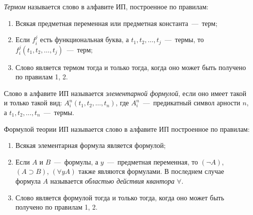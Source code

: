 \begin{definition*}
    \textit{Термом} называется слово в алфавите ИП, построенное по правилам:
    \begin{enumerate}
        \item Всякая предметная переменная или предметная константа~---~терм;
        \item Если $f_i^j$ есть функциональная буква, а $t_1, t_2, \dots, t_j$~---~термы, то $f_i^j(t_1, t_2, \dots, t_j)$~---~терм;
        \item Слово является термом тогда и только тогда, когда оно может быть получено по правилам 1, 2.
    \end{enumerate}
\end{definition*}

\begin{definition*}
    Слово в алфавите ИП называется \textit{элементарной формулой}, если оно имеет такой и только такой вид: $A_i^n(t_1, t_2, \dots, t_n)$, где $A_i^n$~---~предикатный символ арности $n$, а $t_1, t_2, \dots, t_n$~---~термы.
\end{definition*}

\begin{definition*}
    Формулой теории ИП называется слово в алфавите ИП построенное по правилам:
    \begin{enumerate}
        \item Всякая элементарная формула является формулой;
        \item Если $A$ и $B$~---~формулы, а $y$~---~предметная переменная, то $(\neg A)$, $(A \supset B)$, $(\forall yA)$ также являются формулами. В последнем случае формула $A$ называется \textit{областью действия квантора} $\forall$.
        \item Слово является формулой тогда и только тогда, когда оно может быть получено по правилам 1, 2. 
    \end{enumerate}
\end{definition*}


